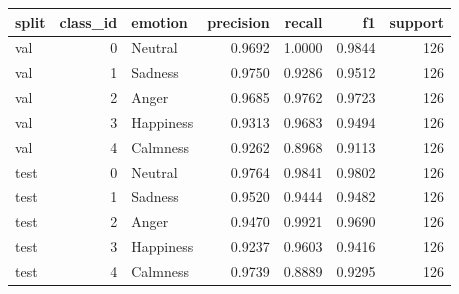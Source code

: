 \begin{tabular}{lrlrrrr}
\toprule
split & class_id & emotion & precision & recall & f1 & support \\
\midrule
val & 0 & Neutral & 0.9692 & 1.0000 & 0.9844 & 126 \\
val & 1 & Sadness & 0.9750 & 0.9286 & 0.9512 & 126 \\
val & 2 & Anger & 0.9685 & 0.9762 & 0.9723 & 126 \\
val & 3 & Happiness & 0.9313 & 0.9683 & 0.9494 & 126 \\
val & 4 & Calmness & 0.9262 & 0.8968 & 0.9113 & 126 \\
test & 0 & Neutral & 0.9764 & 0.9841 & 0.9802 & 126 \\
test & 1 & Sadness & 0.9520 & 0.9444 & 0.9482 & 126 \\
test & 2 & Anger & 0.9470 & 0.9921 & 0.9690 & 126 \\
test & 3 & Happiness & 0.9237 & 0.9603 & 0.9416 & 126 \\
test & 4 & Calmness & 0.9739 & 0.8889 & 0.9295 & 126 \\
\bottomrule
\end{tabular}
